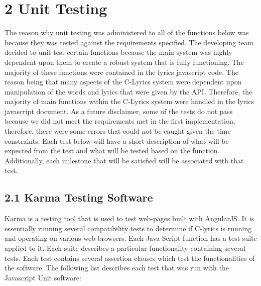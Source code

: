 \documentclass[]{article}
\begin{document}
\section{\textbf{2 Unit Testing}}\label{unit-testing}

The reason why unit testing was administered to all of the functions
below was because they was tested against the requirements specified.
The developing team decided to unit test certain functions because the
main system was highly dependent upon them to create a robust system
that is fully functioning. The majority of these functions were
contained in the lyrics javascript code. The reason being that many
aspects of the C-Lyrics system were dependent upon manipulation of the
words and lyrics that were given by the API. Therefore, the majority of
main functions within the C-Lyrics system were handled in the lyrics
javascript document. As a future disclaimer, some of the tests do not
pass because we did not meet the requirements met in the first
implementation, therefore, there were some errors that could not be
caught given the time constraints. Each test below will have a short
description of what will be expected from the test and what will be
tested based on the function. Additionally, each milestone that will be
satisfied will be associated with that test.

\subsection{\textbf{2.1 Karma Testing
Software}}\label{karma-testing-software}

Karma is a testing tool that is used to test web-pages built with
AngularJS. It is essentially running several compatibility tests to
determine if C-lyrics is running and operating on various web browsers.
Each Java Script function has a test suite applied to it. Each suite
describes a particular functionality containing several tests. Each test
contains several assertion clauses which test the functionalities of the
software. The following list describes each test that was run with the
Javascript Unit software:
\end{document}
